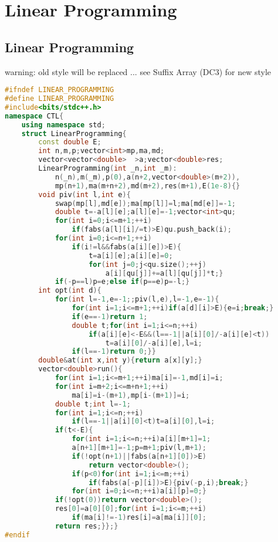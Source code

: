 \documentclass{book}
\begin{document}
\chapter{Linear Programming}
\newpage
{}
\section{Linear Programming}
warning: old style will be replaced ... see Suffix Array (DC3) for new style\begin{lstlisting}[language=C++,title={Linear Programming.hpp (2225 bytes, 52 lines)}]
#ifndef LINEAR_PROGRAMMING
#define LINEAR_PROGRAMMING
#include<bits/stdc++.h>
namespace CTL{
    using namespace std;
    struct LinearProgramming{
        const double E;
        int n,m,p;vector<int>mp,ma,md;
        vector<vector<double>  >a;vector<double>res;
        LinearProgramming(int _n,int _m):
            n(_n),m(_m),p(0),a(n+2,vector<double>(m+2)),
            mp(n+1),ma(m+n+2),md(m+2),res(m+1),E(1e-8){}
        void piv(int l,int e){
            swap(mp[l],md[e]);ma[mp[l]]=l;ma[md[e]]=-1;
            double t=-a[l][e];a[l][e]=-1;vector<int>qu;
            for(int i=0;i<=m+1;++i)
                if(fabs(a[l][i]/=t)>E)qu.push_back(i);
            for(int i=0;i<=n+1;++i)
                if(i!=l&&fabs(a[i][e])>E){
                    t=a[i][e];a[i][e]=0;
                    for(int j=0;j<qu.size();++j)
                        a[i][qu[j]]+=a[l][qu[j]]*t;}
            if(-p==l)p=e;else if(p==e)p=-l;}
        int opt(int d){
            for(int l=-1,e=-1;;piv(l,e),l=-1,e=-1){
                for(int i=1;i<=m+1;++i)if(a[d][i]>E){e=i;break;}
                if(e==-1)return 1;
                double t;for(int i=1;i<=n;++i)
                    if(a[i][e]<-E&&(l==-1||a[i][0]/-a[i][e]<t))
                        t=a[i][0]/-a[i][e],l=i;
                if(l==-1)return 0;}}
        double&at(int x,int y){return a[x][y];}
        vector<double>run(){
            for(int i=1;i<=m+1;++i)ma[i]=-1,md[i]=i;
            for(int i=m+2;i<=m+n+1;++i)
                ma[i]=i-(m+1),mp[i-(m+1)]=i;
            double t;int l=-1;
            for(int i=1;i<=n;++i)
                if(l==-1||a[i][0]<t)t=a[i][0],l=i;
            if(t<-E){
                for(int i=1;i<=n;++i)a[i][m+1]=1;
                a[n+1][m+1]=-1;p=m+1;piv(l,m+1);
                if(!opt(n+1)||fabs(a[n+1][0])>E)
                    return vector<double>();
                if(p<0)for(int i=1;i<=m;++i)
                    if(fabs(a[-p][i])>E){piv(-p,i);break;}
                for(int i=0;i<=n;++i)a[i][p]=0;}
            if(!opt(0))return vector<double>();
            res[0]=a[0][0];for(int i=1;i<=m;++i)
                if(ma[i]!=-1)res[i]=a[ma[i]][0];
            return res;}};}
#endif
\end{lstlisting}
\end{document}
